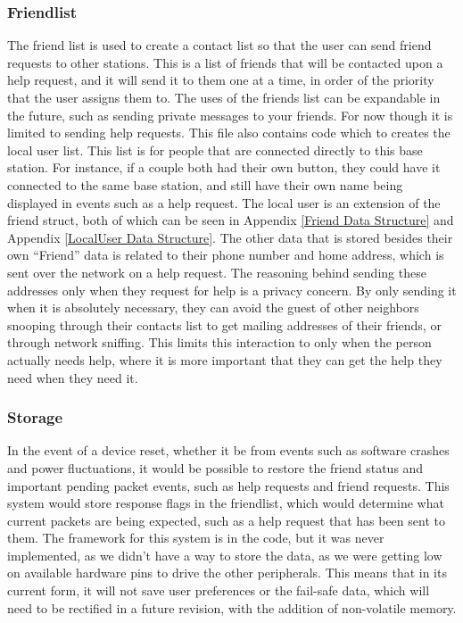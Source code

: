\documentclass[journal,compsoc]{IEEEtran}
\begin{document}
\subsubsection{Friendlist} 
The friend list is used to create a contact list so that the user can send friend requests to other stations. This is a list of friends that will be contacted upon a help request, and it will send it to them one at a time, in order of the priority that the user assigns them to. The uses of the friends list can be expandable in the future, such as sending private messages to your friends. For now though it is limited to sending help requests. This file also contains code which to creates the local user list. This list is for people that are connected directly to this base station. For instance, if a couple both had their own button, they could have it connected to the same base station, and still have their own name being displayed in events such as a help request. The local user is an extension of the friend struct, both of which can be seen in Appendix \ref{Friend Data Structure} and Appendix  \ref{LocalUser Data Structure}. The other data that is stored besides their own “Friend” data is related to their phone number and home address, which is sent over the network on a help request. The reasoning behind sending these addresses only when they request for help is a privacy concern. By only sending it when it is absolutely necessary, they can avoid the guest of other neighbors snooping through their contacts list to get mailing addresses of their friends, or through network sniffing. This limits this interaction to only when the person actually needs help, where it is more important that they can get the help they need when they need it.
\subsubsection{Storage} 
In the event of a device reset, whether it be from events such as software crashes and power fluctuations, it would be possible to restore the friend status and important pending packet events, such as help requests and friend requests. This system would store response flags in the friendlist, which would determine what current packets are being expected, such as a help request that has been sent to them. The framework for this system is in the code, but it was never implemented, as we didn’t have a way to store the data, as we were getting low on available hardware pins to drive the other peripherals. This means that in its current form, it will not save user preferences or the fail-safe data, which will need to be rectified in a future revision, with the addition of non-volatile memory.
\end{document}
